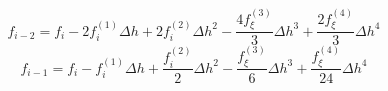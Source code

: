 \begin{equation} 
f_{{i-2}} = f_{i} - 2 f^{{(1)}}_{i} {\Delta h} + 2 f^{{(2)}}_{i} {\Delta h}^{2} - \frac{4 f^{{(3)}}_{{\xi}}}{3} {\Delta h}^{3} + \frac{2 f^{{(4)}}_{{\xi}}}{3} {\Delta h}^{4}
 \end{equation} 
\begin{equation} 
f_{{i-1}} = f_{i} - f^{{(1)}}_{i} {\Delta h} + \frac{f^{{(2)}}_{i}}{2} {\Delta h}^{2} - \frac{f^{{(3)}}_{{\xi}}}{6} {\Delta h}^{3} + \frac{f^{{(4)}}_{{\xi}}}{24} {\Delta h}^{4}
 \end{equation} 
